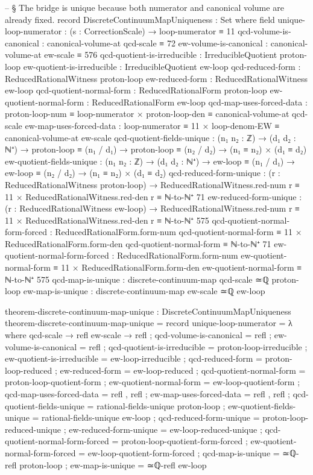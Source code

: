 \documentclass[11pt,a4paper]{book}
\begin{document}
\begin{code}
-- § The bridge is unique because both numerator and canonical volume are already fixed.
record DiscreteContinuumMapUniqueness : Set where
  field
    unique-loop-numerator : (s : CorrectionScale) → loop-numerator ≡ 11
    qcd-volume-is-canonical : canonical-volume-at qcd-scale ≡ 72
    ew-volume-is-canonical : canonical-volume-at ew-scale ≡ 576
    qcd-quotient-is-irreducible : IrreducibleQuotient proton-loop
    ew-quotient-is-irreducible : IrreducibleQuotient ew-loop
    qcd-reduced-form : ReducedRationalWitness proton-loop
    ew-reduced-form : ReducedRationalWitness ew-loop
    qcd-quotient-normal-form : ReducedRationalForm proton-loop
    ew-quotient-normal-form : ReducedRationalForm ew-loop
    qcd-map-uses-forced-data :
      proton-loop-num ≡ loop-numerator × proton-loop-den ≡ canonical-volume-at qcd-scale
    ew-map-uses-forced-data :
      loop-numerator ≡ 11 × loop-denom-EW ≡ canonical-volume-at ew-scale
    qcd-quotient-fields-unique :
      (n₁ n₂ : ℤ) → (d₁ d₂ : ℕ⁺) →
      proton-loop ≡ (n₁ / d₁) →
      proton-loop ≡ (n₂ / d₂) →
      (n₁ ≡ n₂) × (d₁ ≡ d₂)
    ew-quotient-fields-unique :
      (n₁ n₂ : ℤ) → (d₁ d₂ : ℕ⁺) →
      ew-loop ≡ (n₁ / d₁) →
      ew-loop ≡ (n₂ / d₂) →
      (n₁ ≡ n₂) × (d₁ ≡ d₂)
    qcd-reduced-form-unique :
      (r : ReducedRationalWitness proton-loop) →
      ReducedRationalWitness.red-num r ≡ 11
      × ReducedRationalWitness.red-den r ≡ ℕ-to-ℕ⁺ 71
    ew-reduced-form-unique :
      (r : ReducedRationalWitness ew-loop) →
      ReducedRationalWitness.red-num r ≡ 11
      × ReducedRationalWitness.red-den r ≡ ℕ-to-ℕ⁺ 575
    qcd-quotient-normal-form-forced :
      ReducedRationalForm.form-num qcd-quotient-normal-form ≡ 11
      × ReducedRationalForm.form-den qcd-quotient-normal-form ≡ ℕ-to-ℕ⁺ 71
    ew-quotient-normal-form-forced :
      ReducedRationalForm.form-num ew-quotient-normal-form ≡ 11
      × ReducedRationalForm.form-den ew-quotient-normal-form ≡ ℕ-to-ℕ⁺ 575
    qcd-map-is-unique : discrete-continuum-map qcd-scale ≃ℚ proton-loop
    ew-map-is-unique : discrete-continuum-map ew-scale ≃ℚ ew-loop

theorem-discrete-continuum-map-unique : DiscreteContinuumMapUniqueness
theorem-discrete-continuum-map-unique = record
  { unique-loop-numerator = λ where
      qcd-scale → refl
      ew-scale  → refl
  ; qcd-volume-is-canonical = refl
  ; ew-volume-is-canonical = refl
  ; qcd-quotient-is-irreducible = proton-loop-irreducible
  ; ew-quotient-is-irreducible = ew-loop-irreducible
  ; qcd-reduced-form = proton-loop-reduced
  ; ew-reduced-form = ew-loop-reduced
  ; qcd-quotient-normal-form = proton-loop-quotient-form
  ; ew-quotient-normal-form = ew-loop-quotient-form
  ; qcd-map-uses-forced-data = refl , refl
  ; ew-map-uses-forced-data = refl , refl
  ; qcd-quotient-fields-unique = rational-fields-unique proton-loop
  ; ew-quotient-fields-unique = rational-fields-unique ew-loop
  ; qcd-reduced-form-unique = proton-loop-reduced-unique
  ; ew-reduced-form-unique = ew-loop-reduced-unique
  ; qcd-quotient-normal-form-forced = proton-loop-quotient-form-forced
  ; ew-quotient-normal-form-forced = ew-loop-quotient-form-forced
  ; qcd-map-is-unique = ≃ℚ-refl proton-loop
  ; ew-map-is-unique = ≃ℚ-refl ew-loop
  }


\end{code}
\end{document}
